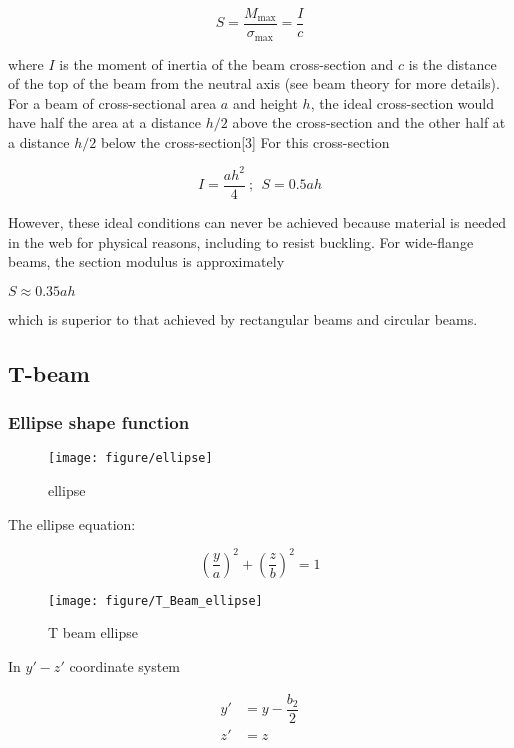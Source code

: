 \begin{equation*}
 S= \dfrac{M_{\mathrm {max}}}{\sigma _{\mathrm  {max}}}={\dfrac {I}{c}}
\end{equation*}
 
where $ I $ is the moment of inertia of the beam cross-section and $ c $ is the distance of the top of the beam from the neutral axis (see beam theory for more details).
For a beam of cross-sectional area $ a $ and height $ h $, the ideal cross-section would have half the area at a distance $ h/2 $ above the cross-section and the other half at a distance $ h/2 $ below the cross-section[3] For this cross-section

\begin{equation*}
 I={\dfrac  {ah^{2}}{4}}~;~~S=0.5ah
\end{equation*}

However, these ideal conditions can never be achieved because material is needed in the web for physical reasons, including to resist buckling. For wide-flange beams, the section modulus is approximately

$  S\approx 0.35ah $
 
which is superior to that achieved by rectangular beams and circular beams.

\subsection{T-beam}
\subsubsection{Ellipse shape function}
\begin{figure}[!h]
\centering
\texttt{[image: figure/ellipse]}
\caption{ellipse}
\label{fig:ellipse}
\end{figure}

The ellipse equation:

\begin{equation*}
\left( \dfrac{y}{a} \right) ^2 + \left( \dfrac{z}{b} \right) ^2 = 1
\end{equation*}

\begin{figure}[h!]
\centering
\texttt{[image: figure/T\_Beam\_ellipse]}
\caption{T beam ellipse}
\label{fig:tbeamellipse}
\end{figure}

In $ y'-z' $ coordinate system

\begin{align*}
y' &= y-\dfrac{b_2}{2} \\
z' &= z
\end{align*}

